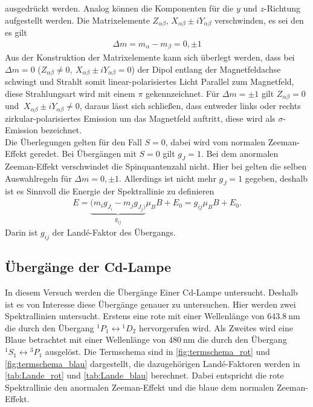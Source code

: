 ausgedrückt werden.
Analog können die Komponenten für die $y$ und $z$-Richtung aufgestellt werden.
Die Matrixelemente $Z_{\alpha\beta}$, $X_{\alpha\beta}\pm i Y_{\alpha\beta}$ verschwinden, es sei den es gilt
\begin{align}
	\Delta m = m_\alpha-m_\beta = 0,\pm1
\end{align}
Aus der Konstruktion der Matrixelemente kann sich überlegt werden, dass bei $\Delta m=0$ ($Z_{\alpha\beta}\not=0,\ X_{\alpha\beta}\pm i Y_{\alpha\beta}=0$) der Dipol entlang der Magnetfeldachse schwingt und Strahlt somit linear-polarisiertes Licht Parallel zum Magnetfeld, diese Strahlungsart wird mit einem $\pi$ gekennzeichnet.
Für $\Delta m =\pm1$ gilt $Z_{\alpha\beta}=0$ und $\ X_{\alpha\beta}\pm i Y_{\alpha\beta}\not=0$, daraus lässt sich schließen, dass entweder links oder rechts zirkular-polarisiertes Emission um das Magnetfeld auftritt, diese wird als $\sigma$-Emission bezeichnet.\\
Die Überlegungen gelten für den Fall $S=0$, dabei wird vom normalen Zeeman-Effekt geredet.
Bei Übergängen mit $S=0$ gilt $g_J=1$.
Bei dem anormalen Zeeman-Effekt verschwindet die Spinquantenzahl nicht.
Hier bei gelten die selben Auswahlregeln für $\Delta m=0,\pm1$.
Allerdings ist nicht mehr $g_J=1$ gegeben, deshalb ist es Sinnvoll die Energie der Spektrallinie zu definieren
\begin{align}
	E=\underbrace{(m_ig_{J_i}-m_jg_{J_j)}}_{g_{ij}}\mu_BB+E_0=g_{ij}\mu_BB+E_0.
	\label{eq:anormaler_zeemann_energie}
\end{align}
Darin ist $g_{ij}$ der Landé-Faktor des Übergangs.
\subsection{Übergänge der Cd-Lampe}
In diesem Versuch werden die Übergänge Einer Cd-Lampe untersucht.
Deshalb ist es von Interesse diese Übergänge genauer zu untersuchen.
Hier werden zwei Spektrallinien untersucht.
Erstens eine rote mit einer Wellenlänge von $\SI{643,8}{\nano\meter}$ die durch den Übergang ${}^1P_1\leftrightarrow{}^1D_2$ hervorgerufen wird.
Als Zweites wird eine Blaue betrachtet mit einer Wellenlänge von $\SI{480}{\nano\meter}$ die durch den Übergang ${}^1S_1\leftrightarrow{}^3P_1$ ausgelöst.
Die Termschema sind in \cref{fig:termschema_rot} und \cref{fig:termschema_blau} dargestellt, die dazugehörigen Landé-Faktoren werden in \cref{tab:Lande_rot} und \cref{tab:Lande_blau} berechnet.
Dabei entspricht die rote Spektrallinie den anormalen Zeeman-Effekt und die blaue dem normalen Zeeman-Effekt.

